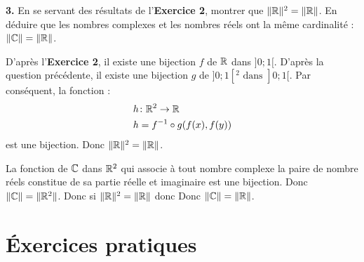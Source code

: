     \hspace*{-1.5em}\textbf{3.} En se servant des résultats de l'\textbf{Exercice 2}, montrer que \(\|\mathbb{R}\|^2=\|\mathbb{R}\|\). En déduire que les nombres complexes et les nombres réels ont la même cardinalité : \(\|\mathbb{C}\|=\|\mathbb{R}\|\).\par
    \headrule
    D'après l'\textbf{Exercice 2}, il existe une bijection \(f\) de \(\mathbb{R}\) dans \(]0;1[\). D'après la question précédente, il existe une bijection \(g\) de \(]0;1[^2\text{ dans }]0;1[\). Par conséquent, la fonction :
    \begin{equation}
    \begin{split}
        h&\colon\mathbb{R}^2\rightarrow\mathbb{R}\\
        h&=f^{-1}\circ g(f(x),f(y))
    \end{split}
    \end{equation}
    est une bijection. Donc \(\|\mathbb{R}\|^2=\|\mathbb{R}\|\).\par
    \vspace{\baselineskip}
    La fonction de \(\mathbb{C}\) dans \(\mathbb{R}^2\) qui associe à tout nombre complexe la paire de nombre réels constitue de sa partie réelle et imaginaire est une bijection. Donc \(\|\mathbb{C}\|=\|\mathbb{R}^2\|\). Donc si \(\|\mathbb{R}\|^2=\|\mathbb{R}\|\) donc Donc \(\|\mathbb{C}\|=\|\mathbb{R}\|\).
    
    \section{\'Exercices pratiques}\label{sec:etudes_cas}